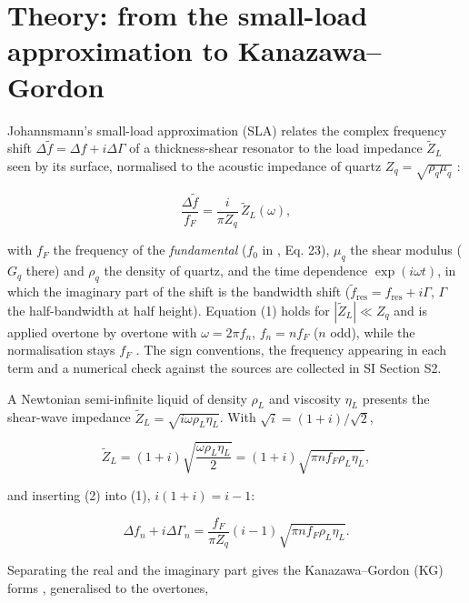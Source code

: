 \documentclass[11pt,a4paper]{article}
\begin{document}
\section{Theory: from the small-load approximation to Kanazawa--Gordon}

Johannsmann's small-load approximation (SLA) relates the complex frequency shift $\Delta\tilde f = \Delta f + i\Delta\Gamma$ of a thickness-shear resonator to the load impedance $\tilde Z_L$ seen by its surface, normalised to the acoustic impedance of quartz $Z_q = \sqrt{\rho_q\mu_q}$ \citep{Johannsmann2008, Johannsmann2015, Johannsmann2021}:

\begin{equation}\tag{1}
\frac{\Delta\tilde f}{f_F} = \frac{i}{\pi Z_q}\,\tilde Z_L(\omega),
\end{equation}

with $f_F$ the frequency of the \emph{fundamental} ($f_0$ in \citep{Johannsmann2021}, Eq. 23), $\mu_q$ the shear modulus ($G_q$ there) and $\rho_q$ the density of quartz, and the time dependence $\exp(i\omega t)$, in which the imaginary part of the shift is the bandwidth shift ($\tilde f_\mathrm{res} = f_\mathrm{res} + i\Gamma$, $\Gamma$ the half-bandwidth at half height). Equation (1) holds for $|\tilde Z_L| \ll Z_q$ and is applied overtone by overtone with $\omega = 2\pi f_n$, $f_n = nf_F$ ($n$ odd), while the normalisation stays $f_F$ \citep{Johannsmann2021}. The sign conventions, the frequency appearing in each term and a numerical check against the sources are collected in SI Section S2.

A Newtonian semi-infinite liquid of density $\rho_L$ and viscosity $\eta_L$ presents the shear-wave impedance $\tilde Z_L = \sqrt{i\omega\rho_L\eta_L}$. With $\sqrt i = (1+i)/\sqrt 2$,

\begin{equation}\tag{2}
\tilde Z_L = (1+i)\sqrt{\frac{\omega\rho_L\eta_L}{2}} = (1+i)\sqrt{\pi n f_F\rho_L\eta_L},
\end{equation}

and inserting (2) into (1), $i(1+i) = i - 1$:

\begin{equation}\tag{3}
\Delta f_n + i\Delta\Gamma_n = \frac{f_F}{\pi Z_q}(i - 1)\sqrt{\pi n f_F\rho_L\eta_L}.
\end{equation}

Separating the real and the imaginary part gives the Kanazawa--Gordon (KG) forms \citep{KanazawaGordon1985AC, KanazawaGordon1985ACA}, generalised to the overtones,
\end{document}
